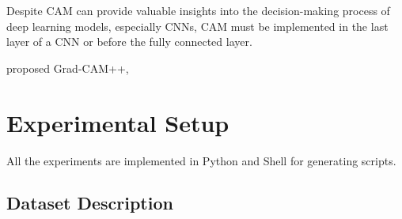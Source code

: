 Despite CAM can provide valuable insights into the decision-making process of deep learning models, especially CNNs, 
CAM must be implemented in the last layer of a CNN or before the fully connected layer.

\citet{chattopadhay2018grad} proposed Grad-CAM++,

\section{Experimental Setup}
\label{sec:setup}

All the experiments are implemented in Python and Shell for generating scripts. 

\subsection{Dataset Description}
\label{sec:setup:datasets}


\begin{table}[ht]
  \centering
  \caption{Overview of statistics of datasets used in our experiment 
  (Note that 600 images in the validation set above are given, 
  we provide the detailed training image statistics for each emotion class in )}
  \label{tab:data}
\end{table}

